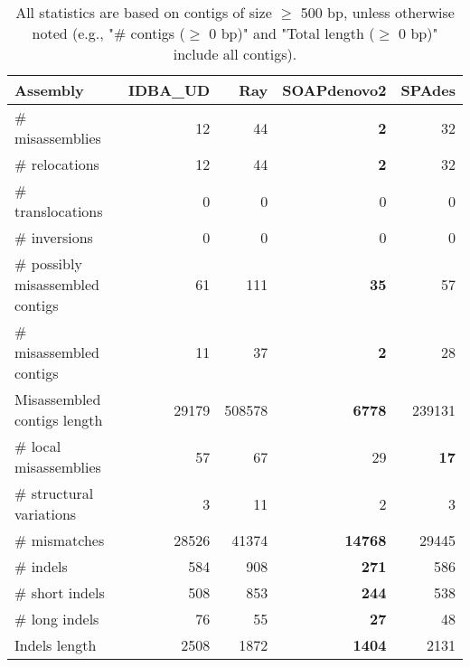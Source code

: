 \documentclass[12pt,a4paper]{article}
\begin{document}
\begin{table}[ht]
\begin{center}
\caption{All statistics are based on contigs of size $\geq$ 500 bp, unless otherwise noted (e.g., "\# contigs ($\geq$ 0 bp)" and "Total length ($\geq$ 0 bp)" include all contigs).}
\begin{tabular}{|l*{4}{|r}|}
\hline
Assembly & IDBA\_UD & Ray & SOAPdenovo2 & SPAdes \\ \hline
\# misassemblies & 12 & 44 & {\bf 2} & 32 \\ \hline
\hspace{5mm}\# relocations & 12 & 44 & {\bf 2} & 32 \\ \hline
\hspace{5mm}\# translocations & 0 & 0 & 0 & 0 \\ \hline
\hspace{5mm}\# inversions & 0 & 0 & 0 & 0 \\ \hline
\# possibly misassembled contigs & 61 & 111 & {\bf 35} & 57 \\ \hline
\# misassembled contigs & 11 & 37 & {\bf 2} & 28 \\ \hline
Misassembled contigs length & 29179 & 508578 & {\bf 6778} & 239131 \\ \hline
\# local misassemblies & 57 & 67 & 29 & {\bf 17} \\ \hline
\# structural variations & 3 & 11 & 2 & 3 \\ \hline
\# mismatches & 28526 & 41374 & {\bf 14768} & 29445 \\ \hline
\# indels & 584 & 908 & {\bf 271} & 586 \\ \hline
\hspace{5mm}\# short indels & 508 & 853 & {\bf 244} & 538 \\ \hline
\hspace{5mm}\# long indels & 76 & 55 & {\bf 27} & 48 \\ \hline
Indels length & 2508 & 1872 & {\bf 1404} & 2131 \\ \hline
\end{tabular}
\end{center}
\end{table}
\end{document}
